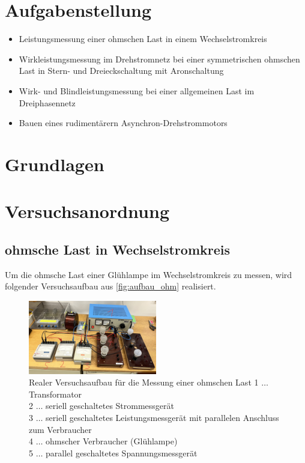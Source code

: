 \documentclass[12pt,english,ngerman]{scrartcl}
\begin{document}
%
\tableofcontents
\newpage

\section{Aufgabenstellung\label{Auf}}

\begin{itemize}
	\item Leistungsmessung einer ohmschen Last in einem Wechselstromkreis
	\item Wirkleistungsmessung im Drehstromnetz bei einer symmetrischen ohmschen Last in Stern- und Dreieckschaltung mit Aronschaltung
	\item Wirk- und Blindleistungsmessung bei einer allgemeinen Last im Dreiphasennetz
	\item Bauen eines rudimentärern Asynchron-Drehstrommotors
\end{itemize}

\section{Grundlagen}\label{Grund}


\section{Versuchsanordnung}
\label{sec:versuchsanordnung}

\subsection{ohmsche Last in Wechselstromkreis}

Um die ohmsche Last einer Glühlampe im Wechselstromkreis zu messen, wird folgender Versuchsaufbau aus \autoref{fig:aufbau_ohm} realisiert.

\begin{figure}[H]
	\begin{center}
		\includegraphics[width = 0.5\textwidth]{./figures/aufbau_ohm.png}
	\end{center}
	\caption[Realer Versuchsaufbau für die Messung einer ohmschen Last]
	{Realer Versuchsaufbau für die Messung einer ohmschen Last
	1 \(\dots\) Transformator  \\
	2 \(\dots\) seriell geschaltetes Strommessgerät  \\
	3 \(\dots\) seriell geschaltetes Leistungsmessgerät mit parallelen Anschluss zum Verbraucher  \\
	4 \(\dots\) ohmscher Verbraucher (Glühlampe)  \\
	5 \(\dots\) parallel geschaltetes Spannungsmessgerät
	}\label{fig:aufbau_ohm}
\end{figure}
\end{document}
